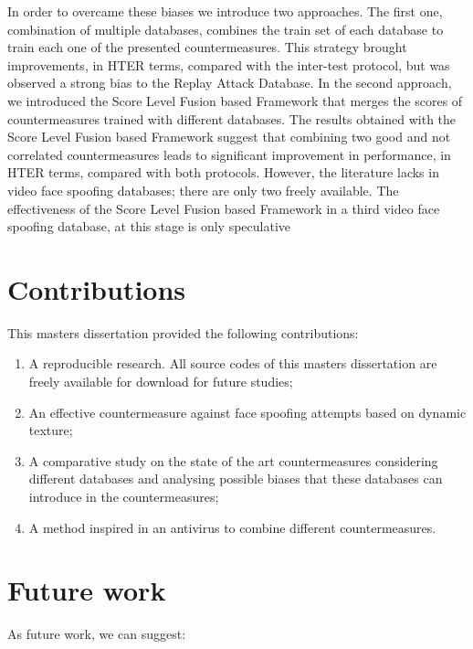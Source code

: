 In order to overcame these biases we introduce two approaches. The first one, combination of multiple databases, combines the train set of each database to train each one of the presented countermeasures. This strategy brought improvements, in HTER terms, compared with the inter-test protocol, but was observed a strong bias to the Replay Attack Database. In the second approach, we introduced the Score Level Fusion based Framework that merges the scores of countermeasures trained with different databases. The results obtained with the Score Level Fusion based Framework suggest that combining two good and not correlated countermeasures leads to significant improvement in performance, in HTER terms, compared with both protocols. However, the literature lacks in video face spoofing databases; there are only two freely available. The effectiveness of the Score Level Fusion based Framework in a third video face spoofing database, at this stage is only speculative

\section{Contributions}

This masters dissertation provided the following contributions:

\begin{enumerate}
	\item A reproducible research. All source codes of this masters dissertation are freely available for download for future studies;
	\item An effective countermeasure against face spoofing attempts based on dynamic texture; 
	\item A comparative study on the state of the art countermeasures considering different databases and analysing possible biases that these databases can introduce in the countermeasures;
	\item A method inspired in an antivirus to combine different countermeasures.
\end{enumerate}


\section{Future work}

As future work, we can suggest:

